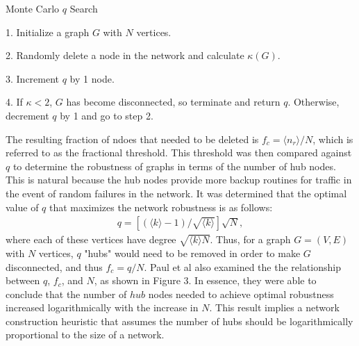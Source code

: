 \documentclass[doc]{apa}%
\begin{document}
\begin{algorithm}
\caption{Monte Carlo $q$ Search}
\label{alg1}
\begin{algorithmic}
	\item 1. Initialize a graph $G$ with $N$ vertices.
	\item 2. Randomly delete a node in the network and calculate $\kappa(G)$.
	\item 3. Increment $q$ by 1 node.
	\item 4. If $\kappa < 2$, $G$ has become disconnected, so terminate and return $q$. Otherwise, decrement $q$ by 1 and go to step 2.
\end{algorithmic}
\end{algorithm}

The resulting fraction of ndoes that needed to be deleted is $f_c = \langle n_r \rangle / N$, which is referred to as the fractional threshold. This threshold was then compared against $q$ to determine the robustness of graphs in terms of the number of hub nodes. This is natural because the hub nodes provide more backup routines for traffic in the event of random failures in the network. It was determined that the optimal value of $q$ that maximizes the network robustness is as follows:
\begin{eqnarray}
q = \left[(\langle k \rangle - 1) / \sqrt{\langle k \rangle}\right]\sqrt{N},
\end{eqnarray}
where each of these vertices have degree $\sqrt{\langle k \rangle N}$. Thus, for a graph $G = (V,E)$ with $N$ vertices, $q$ "hubs" would need to be removed in order to make $G$ disconnected, and thus $f_c = q/N$.
Paul et al also examined the the relationship between $q$, $f_c$, and $N$, as shown in Figure 3. In essence, they were able to conclude that the number of $hub$ nodes needed to achieve optimal robustness increased logarithmically with the increase in $N$. This result implies a network construction heuristic that assumes the number of hubs should be logarithmically proportional to the size of a network. 
\end{document}
